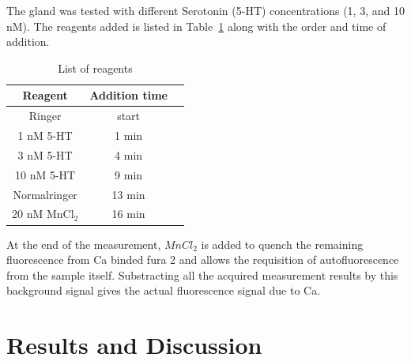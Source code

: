 The gland was tested with different Serotonin (5-HT) concentrations (1, 3, and 10 nM). 
The reagents added is listed in Table~\ref{tab:seroca} along with the order and time of addition.

\begin{table}[hbt]
\caption{List of reagents}
\centering
\begin{tabular}{ccc}
\toprule
Reagent & Addition time \\
\midrule
Ringer				&start\\
1 nM 5-HT			&1 min\\
3 nM 5-HT 			&4 min\\
10 nM 5-HT 		&9 min\\
Normalringer 		&13 min\\
20 nM MnCl$_2$ 	&16 min\\
\bottomrule
\end{tabular}
\label{tab:seroca}
\end{table}

At the end of the measurement, $MnCl_2$ is added to quench the remaining fluorescence from Ca binded fura 2 and allows the requisition of autofluorescence from the sample itself. 
Substracting all the acquired measurement results by this background signal gives the actual fluorescence signal due to Ca.

\section{Results and Discussion}

